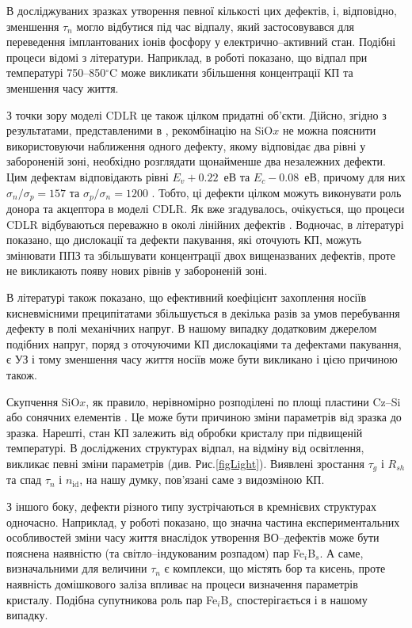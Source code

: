 В досліджуваних зразках утворення певної кількості цих дефектів, і, відповідно, зменшення $\tau _n$ могло відбутися під час відпалу,
який застосовувався для переведення імплантованих іонів фосфору у електрично--активний стан.
Подібні процеси відомі з літератури.
Наприклад, в роботі \cite{SiO:Miyagi} показано, що відпал при температурі 750--850$^\circ$C
може викликати збільшення концентрації КП та зменшення часу життя.

З точки зору моделі CDLR це також цілком придатні об'єкти.
Дійсно, згідно з результатами, представленими в \cite{MurphySC2014,MurphyJAP2012},
рекомбінацію на SiO$x$ не можна пояснити використовуючи наближення одного дефекту, якому відповідає два рівні у забороненій зоні,
необхідно розглядати щонайменше два незалежних дефекти.
Цим дефектам відповідають рівні $E_v+0.22$~еВ та $E_c-0.08$~еВ, причому для них $\sigma_n/\sigma_p=157$ та $\sigma_p/\sigma_n=1200$ \cite{MurphyJAP2012}.
Тобто, ці дефекти цілком можуть виконувати роль донора та акцептора в моделі CDLR.
Як вже згадувалось, очікується, що процеси CDLR відбуваються переважно в околі лінійних дефектів \cite{CDLR:JAP,CDLR:SSP}.
Водночас, в літературі \cite{MurphySC2014,MurphyJAP2011,MurphyJAP2012} показано, що дислокації та дефекти пакування,
які оточують КП, можуть змінювати ППЗ та збільшувати концентрації двох вищеназваних дефектів,
проте не викликають появу  нових рівнів у забороненій зоні.

В літературі \cite{MurphyJAP2011} також показано, що ефективний коефіцієнт захоплення носіїв кисневмісними
преципітатами збільшується в декілька разів за умов перебування дефекту в полі механічних напруг.
В нашому випадку додатковим джерелом подібних напруг, поряд
з оточуючими КП дислокаціями та дефектами пакування, є УЗ і тому зменшення
часу життя носіїв може бути викликано і цією причиною також.

Скупчення SiO$x$, як правило, нерівномірно розподілені по площі пластини  Cz--Si \cite{Oxide_Schon} або сонячних елементів \cite{Oxide:Chen}.
Це може бути причиною зміни параметрів від зразка до зразка.
Нарешті,  стан КП залежить від обробки кристалу при підвищеній температурі.
В досліджених структурах відпал, на відміну від освітлення, викликає певні зміни параметрів (див. Рис.\ref{figLight}).
Виявлені зростання $\tau_g$ і $R_{sh}$ та спад $\tau_n$ і $n_\mathrm{id}$, на нашу думку, пов'язані саме з видозміною КП.

З іншого боку, дефекти різного типу зустрічаються в кремнієвих структурах одночасно.
Наприклад, у роботі \cite{BO:Fe} показано, що значна частина експериментальних особливостей зміни часу життя
внаслідок утворення ВО--дефектів може бути пояснена наявністю (та світло--індукованим розпадом) пар  Fe$_i$B$_s$.
А саме, визначальними для величини $\tau_n$ є комплекси, що містять бор та кисень, проте
наявність домішкового заліза впливає на процеси визначення параметрів кристалу.
Подібна супутникова роль пар Fe$_i$B$_s$ спостерігається і в нашому випадку.

